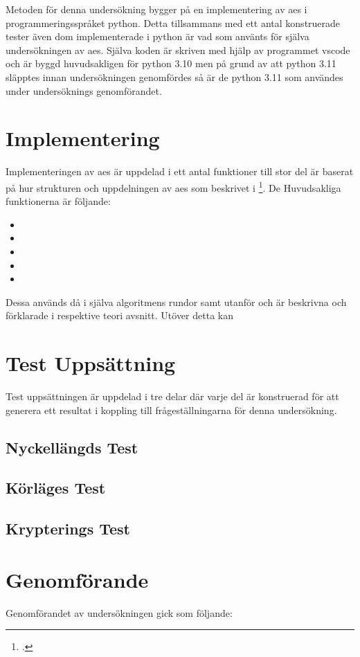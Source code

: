 Metoden för denna undersökning bygger på en implementering av \acrshort{aes} i programmeringsspråket
\gls{python}. Detta tillsammans med ett antal konstruerade tester även dom implementerade i
\gls{python} är vad som använts för själva undersökningen av \acrshort{aes}. Själva koden
är skriven med hjälp av programmet \gls{vscode} och är byggd huvudsakligen för \gls{python} 3.10 men
på grund av att \gls{python} 3.11 släpptes innan undersökningen genomfördes så är de \gls{python} 3.11
som användes under undersöknings genomförandet.

\section{Implementering}
Implementeringen av \acrshort{aes} är uppdelad i ett antal funktioner till stor del är baserat på
hur strukturen och uppdelningen av \acrshort{aes} som beskrivet i \footcite{daemen1999aes}.
De Huvudsakliga funktionerna är följande:
\begin{itemize}
    \item \texttt{}
    \item \texttt{}
    \item \texttt{}
    \item \texttt{}
    \item \texttt{}
\end{itemize}

Dessa används då i själva algoritmens rundor samt utanför och är beskrivna och förklarade i respektive teori avsnitt.
Utöver detta kan

\section{Test Uppsättning}
Test uppsättningen är uppdelad i tre delar där varje del är konstruerad för att generera ett
resultat i koppling till frågeställningarna för denna undersökning.


\subsection{Nyckellängds Test}
\label{sec:nyckellängd-test}


\subsection{Körläges Test}
\label{sec:körlages-test}


\subsection{Krypterings Test}
\label{sec:krypterings-test}


\section{Genomförande}
Genomförandet av undersökningen gick som följande: